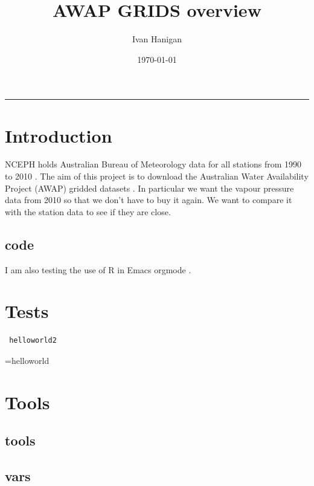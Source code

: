\documentclass[a4paper]{article}
\title{AWAP GRIDS overview}
\author{Ivan Hanigan}
\date{\today}
\begin{document}
\maketitle

\setcounter{tocdepth}{3}
\tableofcontents
\vspace*{1cm}
\hrule

\section{Introduction}
\label{sec-1}

NCEPH holds Australian Bureau of Meteorology data for all stations from 1990 to 2010 \cite{NationalClimateCentreoftheBureauofMeteorology:2005}.
The aim of this project is to download the Australian Water Availability Project (AWAP) gridded datasets \cite{Jones2009}.  In particular we want the vapour pressure data from 2010 so that we don't have to buy it again.  We want to compare it with the station data to see if they are close.
\subsection{code}
\label{sec-1-1}













I am also testing the use of R in Emacs orgmode \cite{Schulte}.
\section{Tests}
\label{sec-2}



\begin{verbatim}
 helloworld2
\end{verbatim}
=helloworld
\section{Tools}
\label{sec-3}
\subsection{tools}
\label{sec-3-1}
\subsection{vars}
\label{sec-3-2}
\end{document}
